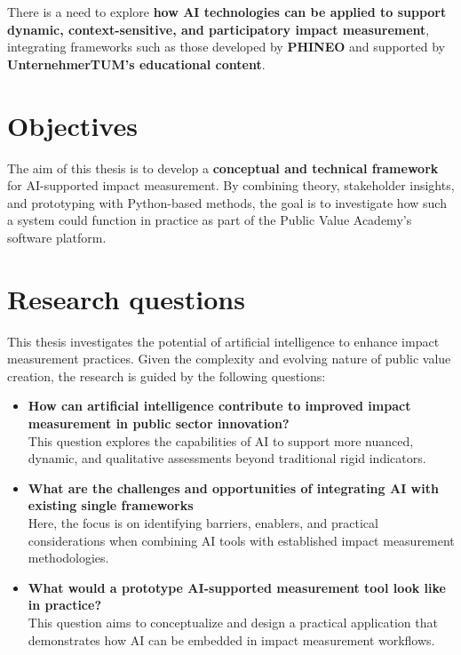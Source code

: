 There is a need to explore \textbf{how AI technologies can be applied to support dynamic, context-sensitive, and participatory impact measurement}, integrating frameworks such as those developed by \textbf{PHINEO} and supported by \textbf{UnternehmerTUM’s educational content}.

\section{Objectives}\label{sec:objectives}
The aim of this thesis is to develop a \textbf{conceptual and technical framework} for AI-supported impact measurement.
By combining theory, stakeholder insights, and prototyping with Python-based methods, the goal is to investigate how such a system could function in practice as part of the Public Value Academy’s software platform.

\section{Research questions}\label{sec:research-questions}

This thesis investigates the potential of artificial intelligence to enhance impact measurement practices.
Given the complexity and evolving nature of public value creation, the research is guided by the following questions:

\begin{itemize}
  \item \textbf{How can artificial intelligence contribute to improved impact measurement in public sector innovation?} \\
  This question explores the capabilities of AI to support more nuanced, dynamic, and qualitative assessments beyond traditional rigid indicators.

  \item \textbf{What are the challenges and opportunities of integrating AI with existing single frameworks} \\
  Here, the focus is on identifying barriers, enablers, and practical considerations when combining AI tools with established impact measurement methodologies.

  \item \textbf{What would a prototype AI-supported measurement tool look like in practice?} \\
  This question aims to conceptualize and design a practical application that demonstrates how AI can be embedded in impact measurement workflows.
\end{itemize}

